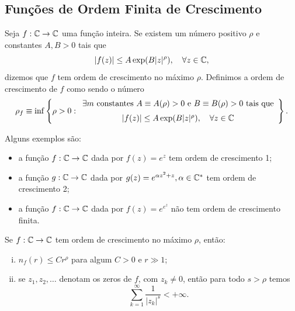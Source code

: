     \subsection{Funções de Ordem Finita de Crescimento}
    \begin{definicao}
    \label{def:ordem-func}
        Seja $f:\mathbb{C}\to\mathbb{C}$ uma função inteira. Se existem um número positivo $\rho$
        e constantes $A,B>0$ tais que
        \begin{equation*}
            |f(z)| \leq A\exp(B|z|^{\rho}),\quad  \forall z\in\mathbb{C},
        \end{equation*}
        dizemos que $f$ tem ordem de crescimento no máximo $\rho$. Definimos a
        ordem de crescimento de $f$ como sendo o número
        \begin{equation*}
            \rho_f 
            \equiv 
            \inf 
            \left\{ 
                \rho > 0 :
                \begin{array}{c}
                    \exists m\ \textrm{constantes}\  
                    A\equiv A(\rho)>0\ \text{e}\ B\equiv B(\rho)>0\ \text{tais que}
                    \\[0.2cm]
                    |f(z)| \leq A\exp(B|z|^{\rho}), \quad \forall z\in\mathbb{C}
                \end{array}
            \right\}.
        \end{equation*}
    \end{definicao}
    Alguns exemplos são:
    \begin{itemize}
        \item a função $f:\mathbb{C}\to\mathbb{C}$ dada por $f(z) = e^z$ tem ordem de crescimento 1;
        \item a função $g:\mathbb{C}\to\mathbb{C}$ dada por $g(z) = e^{\alpha z^2 + z}, \alpha\in\mathbb{C}^*$
        tem ordem de crescimento 2;
        \item a função $f:\mathbb{C}\to\mathbb{C}$ dada por $f(z) = e^{e^z}$ não tem ordem de
        crescimento finita.
    \end{itemize}
    \begin{teorema}
    \label{teo:est-num-zeros}
        Se $f:\mathbb{C}\to\mathbb{C}$ tem ordem de crescimento no máximo $\rho$, então:
        \begin{enumerate}[(i)]
            \item $n_f(r) \leq Cr^{\rho}$ para algum $C>0$ e $r\gg 1$;
            \item se $z_1, z_2, \dots$ denotam os zeros de $f$, com $z_k\neq 0$,
            então para todo $s>\rho$ temos
            \begin{equation*}
                \sum_{k=1}^{\infty} \frac{1}{|z_k|^s} < + \infty.
            \end{equation*}
        \end{enumerate}
    \end{teorema}
